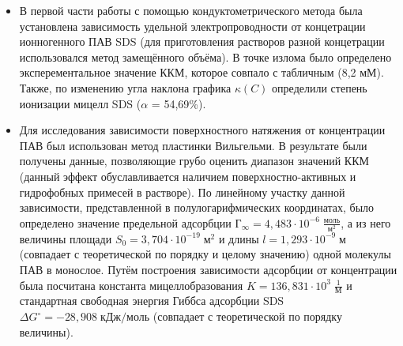 \documentclass[a4paper, 11pt]{article}%
\begin{document}
\begin{itemize}
    \item В первой части работы с помощью кондуктометрического метода была установлена зависимость удельной электропроводности от концетрации ионногенного ПАВ SDS (для приготовления растворов разной концетрации использовался метод замещённого объёма). В точке излома было определено эксперементальное значение ККМ, которое совпало с табличным (8,2 мМ). Также, по изменению угла наклона графика $\kappa(C)$ определили степень ионизации мицелл SDS ($\alpha$ = 54,69\%).
    \item Для исследования зависимости поверхностного натяжения от концентрации ПАВ был использован метод пластинки Вильгельми. В результате были получены данные, позволяющие грубо оценить диапазон значений ККМ (данный эффект обуславливается наличием поверхностно-активных и гидрофобных примесей в растворе). По линейному участку данной зависимости, представленной в полулогарифмических координатах, было определено значение предельной адсорбции  $\text{Г}_{\infty} = 4,483 \cdot 10^{-6} \; \frac{\text{моль}}{\text{м}^2}$, а из него величины площади $S_{0} = 3,704 \cdot 10^{-19} \; \text{м}^2$ и длины $l = 1,293 \cdot 10^{-9} \; \text{м}$ (совпадает с теоретической по порядку и целому значению) одной молекулы ПАВ в монослое. Путём построения зависимости адсорбции от концентрации была посчитана константа мицеллобразования $K = 136,831 \cdot 10^{3}\; \frac{1}{\text{М}}$ и стандартная свободная энергия Гиббса адсорбции SDS $\Delta G^{\circ} = - 28,908 \; \text{кДж}/\text{моль}$ (совпадает с теоретической по порядку величины).  
\end{itemize}
\end{document}
